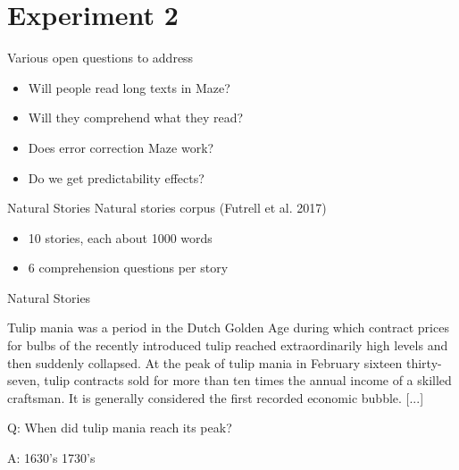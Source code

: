 \documentclass[ 12pt, xcolor=beamer,table,usenames,dvipsnames, ignorenonframetext, ngerman]{beamer}
\begin{document}
\section{Experiment 2}
\begin{frame}{}
	Various open questions to address \pause
	\begin{itemize}
		\item Will people read long texts in Maze? \pause
		\item Will they comprehend what they read? \pause
		\item Does error correction Maze work? \pause
		\item Do we get predictability effects? 
	\end{itemize}
\end{frame}

\begin{frame}{Natural Stories}
	Natural stories corpus (Futrell et al. 2017) \pause
	\begin{itemize}
		\item 10 stories, each about 1000 words \pause
		\item 6 comprehension questions per story
	\end{itemize}
	
\end{frame}


\begin{frame}{Natural Stories}

\begin{small}Tulip mania was a period in the Dutch Golden Age during which contract prices for bulbs of the recently introduced tulip reached extraordinarily high levels and then suddenly collapsed. At the peak of tulip mania in February sixteen thirty-seven, tulip contracts sold for more than ten times the annual income of a skilled craftsman. It is generally considered the first recorded economic bubble. [...]
\medskip

Q: When did tulip mania reach its peak?

A: \hspace{3em} 1630's\hspace{3em} 1730's \end{small}

\end{frame}
\end{document}
